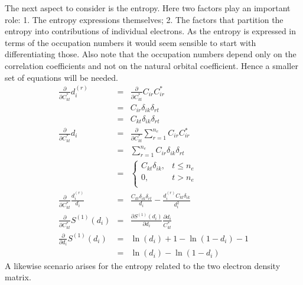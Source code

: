 \documentclass[pra]{revtex4-1}
\begin{document}
The next aspect to consider is the entropy. Here two factors play an important
role: 1. The entropy expressions themselves; 2. The factors that partition the
entropy into contributions of individual electrons.
As the entropy is expressed in terms of the occupation numbers it would seem
sensible to start with differentiating those. Also note that the occupation
numbers depend only on the correlation coefficients and not on the natural
orbital coefficient. Hence a smaller set of equations will be needed.
\begin{eqnarray}
   \frac{\partial}{\partial C^*_{kt}}d^{(r)}_i
   &=& \frac{\partial}{\partial C^*_{kt}}C_{ir}C^*_{ir} \\
   &=& C_{ir}\delta_{ik}\delta_{rt} \\
   &=& C_{kt}\delta_{ik}\delta_{rt} \\
   \frac{\partial}{\partial C^*_{kt}}d_i
   &=& \frac{\partial}{\partial C^*_{kt}}\sum_{r=1}^{n_e}C_{ir}C^*_{ir} \\
   &=& \sum_{r=1}^{n_e}C_{ir}\delta_{ik}\delta_{rt} \\
   &=& \left\{\begin{array}{cc}
              C_{kt}\delta_{ik}, & t \le n_e \\
              0, & t > n_e \\
              \end{array}\right.\\
   \frac{\partial}{\partial C^*_{kt}}\frac{d^{(r)}_i}{d_i}
   &=& \frac{C_{kt}\delta_{ik}\delta_{rt}}{d_i}
      -\frac{d^{(r)}_iC_{kt}\delta_{ik}}{d_i^2} \\
   \frac{\partial}{\partial C^*_{kt}}S^{(1)}(d_i)
   &=& \frac{\partial S^{(1)}(d_i)}{\partial d_i}\frac{\partial d_i}{C^*_{kt}} \\
   \frac{\partial}{\partial d_i}S^{(1)}(d_i)
   &=& \ln(d_i) + 1 - \ln(1-d_i) - 1\\
   &=& \ln(d_i) - \ln(1-d_i)
\end{eqnarray}
A likewise scenario arises for the entropy related to the two electron 
density matrix.
\end{document}
